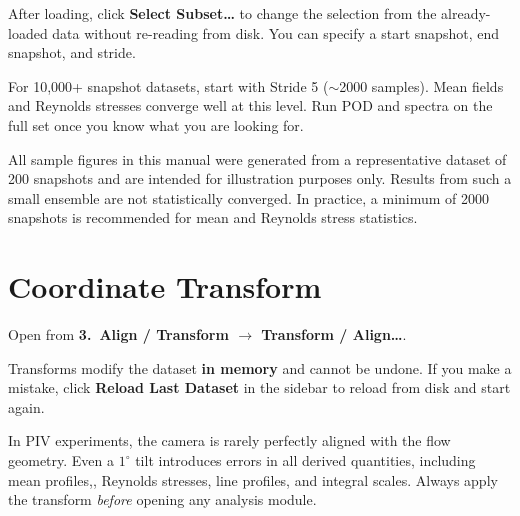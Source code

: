 \documentclass[11pt, a4paper]{report}
\newcommand{\uipth}[1]{\textbf{\textcolor{upblue}{#1}}}
\begin{document}

After loading, click \uipth{Select Subset\ldots} to change the selection from the already-loaded data without re-reading from disk. You can specify a start snapshot, end snapshot, and stride.

\begin{tipbox}
For 10,000+ snapshot datasets, start with Stride 5 ($\sim$2000 samples). Mean fields and Reynolds stresses converge well at this level. Run POD and spectra on the full set once you know what you are looking for.
\end{tipbox}

\begin{notebox}
All sample figures in this manual were generated from a representative dataset of 200 snapshots and are intended for illustration purposes only. Results from such a small ensemble are not statistically converged. In practice, a minimum of 2000 snapshots is recommended for mean and Reynolds stress statistics.
\end{notebox}

\chapter{Coordinate Transform}
\label{ch:transform}

Open from \uipth{3.\ Align / Transform $\to$ Transform / Align\ldots}.

\begin{warnbox}
Transforms modify the dataset \textbf{in memory} and cannot be undone. If you make a mistake, click \uipth{Reload Last Dataset} in the sidebar to reload from disk and start again.
\end{warnbox}

In PIV experiments, the camera is rarely perfectly aligned with the flow geometry. Even a $1^\circ$ tilt introduces errors in all derived quantities, including mean profiles,, Reynolds stresses, line profiles, and integral scales. Always apply the transform \emph{before} opening any analysis module.
\end{document}
